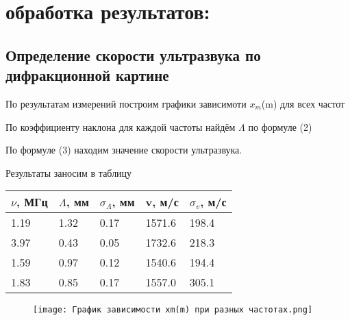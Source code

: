 \documentclass[a4paper, 12pt]{article}
\begin{document}
\large\section{обработка результатов:}
\subsection{Определение скорости ультразвука по дифракционной картине}
\par
По результатам измерений построим графики зависимоти $x_{m}$(m) для всех частот
\par
По коэффициенту наклона для каждой частоты найдём $\Lambda$ по формуле (2)
\par
По формуле (3) находим значение скорости ультразвука.
\par
Результаты заносим в таблицу

\begin{table}[h]
\begin{tabular}{|l|l|l|l|l|}
\hline
$\nu$, МГц & $\Lambda$, мм & $\sigma_{\Lambda}$, мм & v, м/с & $\sigma_{v}$, м/с \\ \hline
1.19       & 1.32         & 0.17                  & 1571.6 & 198.4             \\ \hline
3.97       & 0.43         & 0.05                  & 1732.6 & 218.3             \\ \hline
1.59       & 0.97         & 0.12                  & 1540.6 & 194.4             \\ \hline
1.83       & 0.85         & 0.17                  & 1557.0 & 305.1             \\ \hline
\end{tabular}
\end{table}
\newpage

\begin{figure}[h]
\centering
\texttt{[image: График зависимости xm(m) при разных частотах.png]}
\end{figure}
\end{document}
